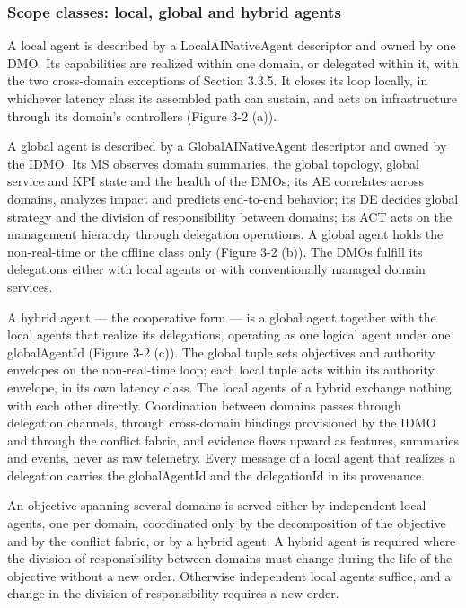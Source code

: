 \hypertarget{scope-classes-local-global-and-hybrid-agents}{%
\subsubsection{Scope classes: local, global and hybrid agents}\label{scope-classes-local-global-and-hybrid-agents}}

A local agent is described by a LocalAINativeAgent descriptor and owned
by one DMO. Its capabilities are realized within one domain, or
delegated within it, with the two cross-domain exceptions of Section
3.3.5. It closes its loop locally, in whichever latency class its
assembled path can sustain, and acts on infrastructure through its
domain's controllers (Figure 3-2 (a)).

A global agent is described by a GlobalAINativeAgent descriptor and
owned by the IDMO. Its MS observes domain summaries, the global
topology, global service and KPI state and the health of the DMOs; its
AE correlates across domains, analyzes impact and predicts end-to-end
behavior; its DE decides global strategy and the division of
responsibility between domains; its ACT acts on the management hierarchy
through delegation operations. A global agent holds the non-real-time or
the offline class only (Figure 3-2 (b)). The DMOs fulfill its
delegations either with local agents or with conventionally managed
domain services.

A hybrid agent --- the cooperative form --- is a global agent together
with the local agents that realize its delegations, operating as one
logical agent under one globalAgentId (Figure 3-2 (c)). The global tuple
sets objectives and authority envelopes on the non-real-time loop; each
local tuple acts within its authority envelope, in its own latency
class. The local agents of a hybrid exchange nothing with each other
directly. Coordination between domains passes through delegation
channels, through cross-domain bindings provisioned by the IDMO and
through the conflict fabric, and evidence flows upward as features,
summaries and events, never as raw telemetry. Every message of a local
agent that realizes a delegation carries the globalAgentId and the
delegationId in its provenance.

An objective spanning several domains is served either by independent
local agents, one per domain, coordinated only by the decomposition of
the objective and by the conflict fabric, or by a hybrid agent. A hybrid
agent is required where the division of responsibility between domains
must change during the life of the objective without a new order.
Otherwise independent local agents suffice, and a change in the division
of responsibility requires a new order.

